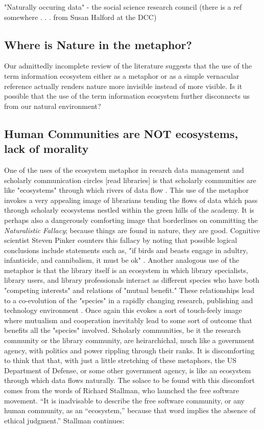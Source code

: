 "Naturally occuring data" - the social science research council (there is a ref somewhere . . . from Susan Halford at the DCC)

\subsection{Where is Nature in the metaphor?}

Our admittedly incomplete review of the literature suggests that the use of the term information ecosystem either as a metaphor or as a simple vernacular reference actually renders nature more invisible instead of more visible. Is it possible that the use of the term information ecosystem further disconnects us from our natural environment? \citep[cf. ][]{worthy_2013}

\subsection{Human Communities are NOT ecosystems, lack of morality}

One of the uses of the ecosystem metaphor in reearch data management and scholarly communication circles [read libraries] is that scholarly communities are like "ecosystems" through which rivers of data flow \citep{choudhury_2010}. This use of the metaphor invokes a very appealing image of librarians tending the flows of data which pass through scholarly ecosystems nestled within the green hills of the academy. It is perhaps also a dangerously comforting image that borderlines on committing the \textit{Naturalistic Fallacy}; because things are found in nature, they are good. Cognitive scientist Steven Pinker counters this fallacy by noting that possible logical conclusions include statements such as, "if birds and beasts engage in adultry, infanticide, and cannibalism, it must be ok" \citep{pinker_2002}. Another analogous use of the metaphor is that the library itself is an ecosystem in which library specialists, library users, and library professionals interact as different species who have both "competing interests" and relations of "mutual benefit." These relationships lead to a co-evolution of the "species" in a rapidly changing research, publishing and technology environment \citep{walter_2008}. Once again this evokes a sort of touch-feely image where mutualism and cooperation inevitably lead to some sort of outcome that benefits all the "species" involved. Scholarly communities, be it the research community or the library community, are heirarchichal, much like a government agency, with politics and power rippling through their ranks. It is discomforting to think that that, with just a little stretching of these metaphors, the US Department of Defense, or some other government agency, is like an ecosystem through which data flows naturally. The solace to be found with this discomfort comes from the words of Richard Stallman, who launched the free software movement. “It is inadvisable to describe the free software community, or any human community, as an “ecosystem,” because that word implies the absence of ethical judgment.”  Stallman continues:
 
